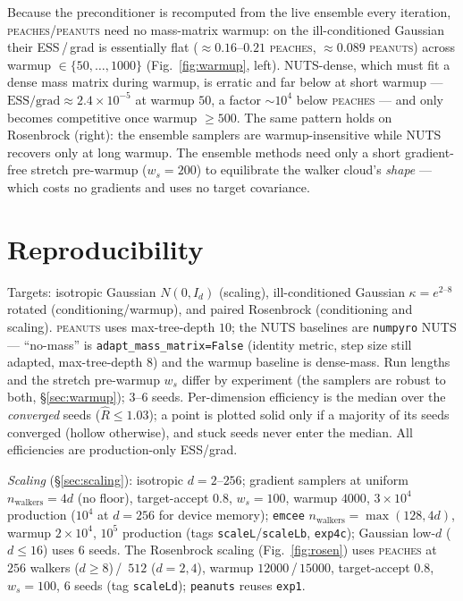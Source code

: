 \documentclass[11pt]{article}
\begin{document}
Because the preconditioner is recomputed from the live ensemble every
iteration, \textsc{peaches}/\textsc{peanuts} need no mass-matrix warmup: on the
ill-conditioned Gaussian their ESS\,/\,grad is essentially flat
($\approx\!0.16$--$0.21$ \textsc{peaches}, $\approx\!0.089$ \textsc{peanuts}) across warmup
$\in\{50,\dots,1000\}$ (Fig.~\ref{fig:warmup}, left). NUTS-dense, which must
fit a dense mass matrix during warmup, is erratic and far below at short
warmup --- $\text{ESS}/\text{grad}\approx2.4\times10^{-5}$ at warmup $50$, a factor
$\sim\!10^4$ below \textsc{peaches} --- and only becomes competitive once
warmup $\ge\!500$. The same pattern holds on Rosenbrock (right): the ensemble
samplers are warmup-insensitive while NUTS recovers only at long warmup. The
ensemble methods need only a short gradient-free stretch pre-warmup
($w_s{=}200$) to equilibrate the walker cloud's \emph{shape} --- which costs no
gradients and uses no target covariance.

\section{Reproducibility}

Targets: isotropic Gaussian $N(0,I_d)$ (scaling), ill-conditioned Gaussian
$\kappa=e^{2\text{--}8}$ rotated (conditioning/warmup), and paired Rosenbrock
(conditioning and scaling). \textsc{peanuts} uses max-tree-depth $10$; the NUTS baselines are
\texttt{numpyro} NUTS --- ``no-mass'' is \texttt{adapt\_mass\_matrix=False}
(identity metric, step size still adapted, max-tree-depth $8$) and the warmup
baseline is dense-mass. Run lengths and the stretch pre-warmup $w_s$ differ by
experiment (the samplers are robust to both, \S\ref{sec:warmup}); $3$--$6$ seeds.
Per-dimension efficiency is the median over the \emph{converged} seeds
($\hat R\le1.03$); a point is plotted solid only if a majority of its seeds
converged (hollow otherwise), and stuck seeds never enter the median. All
efficiencies are production-only ESS/grad.

\textit{Scaling} (\S\ref{sec:scaling}): isotropic $d{=}2$--$256$; gradient
samplers at uniform $n_{\text{walkers}}=4d$ (no floor), target-accept $0.8$,
$w_s{=}100$, warmup $4000$, $3\!\times\!10^4$ production ($10^4$ at $d{=}256$ for
device memory); \texttt{emcee} $n_{\text{walkers}}=\max(128,4d)$, warmup
$2\!\times\!10^4$, $10^5$ production (tags \texttt{scaleL}/\texttt{scaleLb},
\texttt{exp4c}); Gaussian low-$d$ ($d\le16$) uses $6$ seeds. The Rosenbrock
scaling (Fig.~\ref{fig:rosen}) uses \textsc{peaches} at $256$ walkers ($d\ge8$)\,/\,
$512$ ($d{=}2,4$), warmup $12000$\,/\,$15000$, target-accept $0.8$, $w_s{=}100$,
$6$ seeds (tag \texttt{scaleLd}); \texttt{peanuts} reuses \texttt{exp1}.
\end{document}
